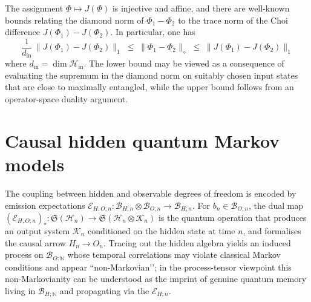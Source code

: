 \documentclass[11pt, reco]{article}
\begin{document}
The assignment $\Phi\mapsto J(\Phi)$ is injective and affine, and there are well-known bounds relating the diamond norm of $\Phi_1-\Phi_2$ to the trace norm of the Choi difference $J(\Phi_1)-J(\Phi_2)$. In particular, one has
\begin{equation}\label{eq:diamond-choi-bounds}
\frac{1}{d_{\mathrm{in}}}\,
\bigl\|J(\Phi_1)-J(\Phi_2)\bigr\|_1
\;\le\;
\|\Phi_1-\Phi_2\|_{\diamond}
\;\le\;
\bigl\|J(\Phi_1)-J(\Phi_2)\bigr\|_1
\end{equation}
where $d_{\mathrm{in}}=\dim\mathcal{H}_{\mathrm{in}}$. The lower bound may be viewed as a consequence of evaluating the supremum in the diamond norm on suitably chosen input states that are close to maximally entangled, while the upper bound follows from an operator-space duality argument.


\section{Causal hidden quantum Markov models}\label{Sec-CausalHQMM}
The coupling between hidden and observable degrees of freedom is encoded by emission expectations \(\mathcal{E}_{H,O;n}:\mathcal{B}_{H;n}\otimes\mathcal{B}_{O;n}\to\mathcal{B}_{H;n}\). For \(b_n\in\mathcal{B}_{O;n}\), the dual map \((\mathcal{E}_{H,O;n})_*:\mathfrak{S}(\mathcal{H}_n)\to\mathfrak{S}(\mathcal{H}_n\otimes\mathcal{K}_n)\) is the quantum operation that produces an output system \(\mathcal{K}_n\) conditioned on the hidden state at time \(n\), and formalises the causal arrow \(H_n\to O_n\). Tracing out the hidden algebra yields an induced process on \(\mathcal{B}_{O;\mathbb{N}}\) whose temporal correlations may violate classical Markov conditions and appear “non-Markovian’’; in the process-tensor viewpoint \cite{MilzStrasberg21} this non-Markovianity can be understood as the imprint of genuine quantum memory living in \(\mathcal{B}_{H;\mathbb{N}}\) and propagating via the \(\mathcal{E}_{H;n}\).
\end{document}

